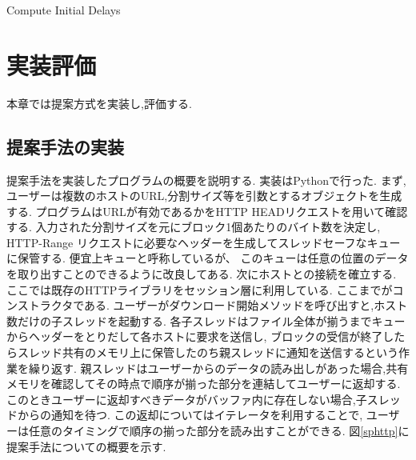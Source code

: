 \documentclass[a4j,12pt]{gradthesis_utf8}
\begin{document}
\begin{algorithm}
	\caption{Compute Initial Delays}
	\begin{algorithmic}[1]
		\EndFor
	\end{algorithmic}
	
\end{algorithm}


\chapter{実装評価}\label{sec:sec4}

本章では提案方式を実装し,評価する.

\section{提案手法の実装}
提案手法を実装したプログラムの概要を説明する.
実装はPythonで行った.
まず,ユーザーは複数のホストのURL,分割サイズ等を引数とするオブジェクトを生成する.
プログラムはURLが有効であるかをHTTP HEADリクエストを用いて確認する.
入力された分割サイズを元にブロック1個あたりのバイト数を決定し,
HTTP-Range リクエストに必要なヘッダーを生成してスレッドセーフなキューに保管する.
便宜上キューと呼称しているが、
このキューは任意の位置のデータを取り出すことのできるように改良してある.
次にホストとの接続を確立する.
ここでは既存のHTTPライブラリをセッション層に利用している.
ここまでがコンストラクタである.
ユーザーがダウンロード開始メソッドを呼び出すと,ホスト数だけの子スレッドを起動する.
各子スレッドはファイル全体が揃うまでキューからヘッダーをとりだして各ホストに要求を送信し,
ブロックの受信が終了したらスレッド共有のメモリ上に保管したのち親スレッドに通知を送信するという作業を繰り返す.
親スレッドはユーザーからのデータの読み出しがあった場合,共有メモリを確認してその時点で順序が揃った部分を連結してユーザーに返却する.
このときユーザーに返却すべきデータがバッファ内に存在しない場合,子スレッドからの通知を待つ.
この返却についてはイテレータを利用することで,
ユーザーは任意のタイミングで順序の揃った部分を読み出すことができる.
図\ref{sphttp}に提案手法についての概要を示す.

\end{document}
